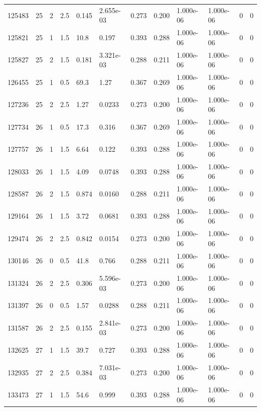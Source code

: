\documentclass[preview]{standalone}
\begin{document}
{{{{{{\begin{tabular}{L{1.2cm}C{1.2cm} C{0.3cm}C{0.5cm} C{1.4cm}C{1.4cm} C{1.4cm}C{1.4cm} C{1.6cm}C{1.6cm} C{1.6cm}C{1.6cm}}
  125483  &    25  & 2     & 2.5 &  0.145  & 2.655e-03  &  0.273&   0.200& 1.000e-06 & 1.000e-06   &  0 & 0  \\ 
  125821  &    25  & 1     & 1.5 &  10.8  & 0.197  &  0.393&   0.288& 1.000e-06 & 1.000e-06   &  0 & 0  \\ 
  125827  &    25  & 2     & 1.5 &  0.181  & 3.321e-03  &  0.288&   0.211& 1.000e-06 & 1.000e-06   &  0 & 0  \\ 
  126455  &    25  & 1     & 0.5 &  69.3  & 1.27  &  0.367&   0.269& 1.000e-06 & 1.000e-06   &  0 & 0  \\ 
  127236  &    25  & 2     & 2.5 &  1.27  & 0.0233  &  0.273&   0.200& 1.000e-06 & 1.000e-06   &  0 & 0  \\ 
  127734  &    26  & 1     & 0.5 &  17.3  & 0.316  &  0.367&   0.269& 1.000e-06 & 1.000e-06   &  0 & 0  \\ 
  127757  &    26  & 1     & 1.5 &  6.64  & 0.122  &  0.393&   0.288& 1.000e-06 & 1.000e-06   &  0 & 0  \\ 
  128033  &    26  & 1     & 1.5 &  4.09  & 0.0748  &  0.393&   0.288& 1.000e-06 & 1.000e-06   &  0 & 0  \\ 
  128587  &    26  & 2     & 1.5 &  0.874  & 0.0160  &  0.288&   0.211& 1.000e-06 & 1.000e-06   &  0 & 0  \\ 
  129164  &    26  & 1     & 1.5 &  3.72  & 0.0681  &  0.393&   0.288& 1.000e-06 & 1.000e-06   &  0 & 0  \\ 
  129474  &    26  & 2     & 2.5 &  0.842  & 0.0154  &  0.273&   0.200& 1.000e-06 & 1.000e-06   &  0 & 0  \\ 
  130146  &    26  & 0     & 0.5 &  41.8  & 0.766  &  0.288&   0.211& 1.000e-06 & 1.000e-06   &  0 & 0  \\ 
  131324  &    26  & 2     & 2.5 &  0.306  & 5.596e-03  &  0.273&   0.200& 1.000e-06 & 1.000e-06   &  0 & 0  \\ 
  131397  &    26  & 0     & 0.5 &  1.57  & 0.0288  &  0.288&   0.211& 1.000e-06 & 1.000e-06   &  0 & 0  \\ 
  131587  &    26  & 2     & 2.5 &  0.155  & 2.841e-03  &  0.273&   0.200& 1.000e-06 & 1.000e-06   &  0 & 0  \\ 
  132625  &    27  & 1     & 1.5 &  39.7  & 0.727  &  0.393&   0.288& 1.000e-06 & 1.000e-06   &  0 & 0  \\ 
  132935  &    27  & 2     & 2.5 &  0.384  & 7.031e-03  &  0.273&   0.200& 1.000e-06 & 1.000e-06   &  0 & 0  \\ 
  133473  &    27  & 1     & 1.5 &  54.6  & 0.999  &  0.393&   0.288& 1.000e-06 & 1.000e-06   &  0 & 0  \\ 

\end{tabular}}}}}}}
\end{document}
